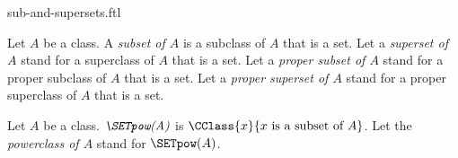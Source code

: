 \documentclass{stex}
\begin{document}
\begin{smodule}{sub-and-supersets.ftl}

\begin{definition}[forthel]
  Let $A$ be a class.
  A \emph{subset of $A$} is a subclass of $A$ that is a set.
  Let a \emph{superset of $A$} stand for a superclass of $A$ that is a set.
  Let a \emph{proper subset of $A$} stand for a proper subclass of $A$ that is a set.
  Let a \emph{proper superset of $A$} stand for a proper superclass of $A$ that is a set.
\end{definition}

\begin{definition}[forthel]
  Let $A$ be a class.
  $\emph{\SETpow(A)}$ is $\CClass{x}{x\text{ is a subset of }A}$.
  Let the \emph{powerclass of $A$} stand for $\SETpow(A)$.
\end{definition}
\end{smodule}
\end{document}
